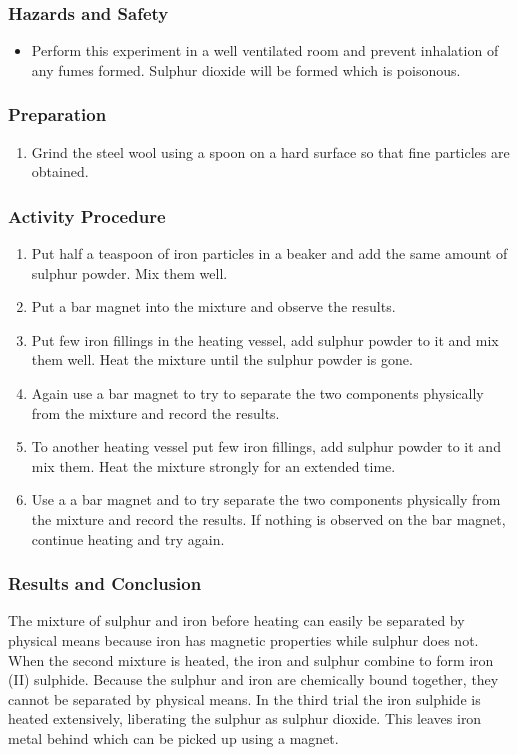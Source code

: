 \subsubsection*{Hazards and Safety}
\begin{itemize}
\item{Perform this experiment in a well ventilated room and prevent inhalation of any fumes formed. Sulphur dioxide will be formed which is poisonous.}
\end{itemize}

\subsubsection*{Preparation}
\begin{enumerate}
\item{Grind the steel wool using a spoon on a hard surface so that fine particles are obtained.}
\end{enumerate}

\subsubsection*{Activity Procedure}
\begin{enumerate}
\item{Put half a teaspoon of iron particles in a beaker and add the same amount of sulphur powder. Mix them well.}
\item{Put a bar magnet into the mixture and observe the results.}
\item{Put few iron fillings in the heating vessel, add sulphur powder to it and mix them well. Heat the mixture until the sulphur powder is gone.}
\item{Again use a bar magnet to try to separate the two components physically from the mixture and record the results.}
\item{To another heating vessel put few iron fillings, add sulphur powder to it and mix them. Heat the mixture strongly for an extended time.}
\item{Use a a bar magnet and to try separate the two components physically from the mixture and record the results. If nothing is observed on the bar magnet, continue heating and try again.}
\end{enumerate}

\subsubsection*{Results and Conclusion}
The mixture of sulphur and iron before heating can easily be separated by physical means because iron has magnetic properties while sulphur does not. When the second mixture is heated, the iron and sulphur combine to form iron (II) sulphide. Because the sulphur and iron are chemically bound together, they cannot be separated by physical means. In the third trial the iron sulphide is heated extensively, liberating the sulphur as sulphur dioxide. This leaves iron metal behind which can be picked up using a magnet.

